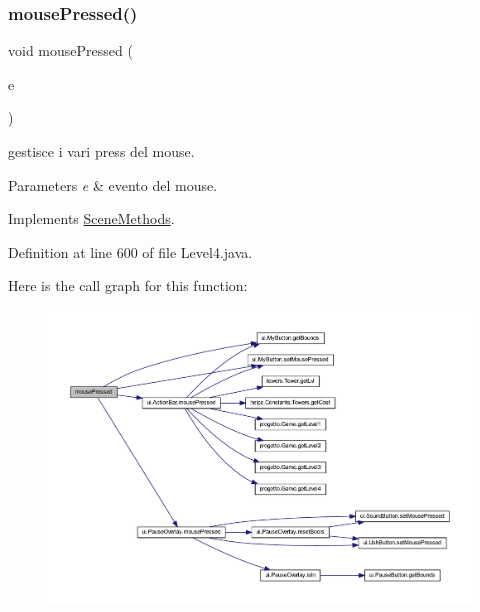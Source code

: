 \subsubsection{\texorpdfstring{mouse\+Pressed()}{mousePressed()}}
{\footnotesize\ttfamily void mouse\+Pressed (\begin{DoxyParamCaption}\item[{Mouse\+Event}]{e }\end{DoxyParamCaption})}



gestisce i vari press del mouse. 


\begin{DoxyParams}{Parameters}
{\em e} & evento del mouse. \\
\hline
\end{DoxyParams}


Implements \hyperlink{interfacescenes_1_1_scene_methods_aed82e1ce3dd3cf283d508c3ba3be70ef}{Scene\+Methods}.



Definition at line 600 of file Level4.\+java.

Here is the call graph for this function\+:\nopagebreak
\begin{figure}[H]
\begin{center}
\leavevmode
\includegraphics[width=350pt]{classscenes_1_1_level4_aed82e1ce3dd3cf283d508c3ba3be70ef_cgraph}
\end{center}
\end{figure}
\mbox{\label{classscenes_1_1_level4_a87a07291794e15052db67f945d90853e}} 
